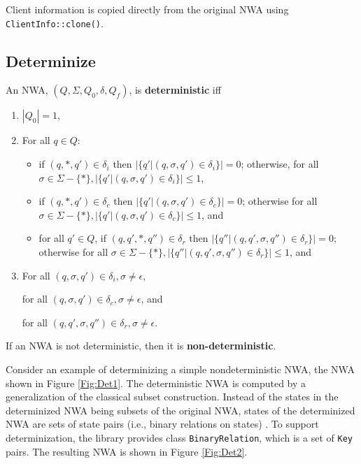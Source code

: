Client
information is copied directly from the original NWA using
\texttt{ClientInfo::clone()}.

\subsection{Determinize}
\label{Se:Determinize}

\begin{definition}
An NWA, $(Q,\Sigma,Q_0,\delta,Q_f)$, is \textbf{deterministic} iff 

\begin{enumerate} 

\item $|Q_0| = 1$, 

\item For all $q \in Q$: 
  \begin{itemize}
    \item if $(q,*,q') \in \delta_i$ then $|\{q'|(q,\sigma,q') \in
      \delta_i\}| = 0$; otherwise, for all $\sigma \in \Sigma - \{*\},
      |\{q'|(q,\sigma,q') \in \delta_i\}| \leq 1$,

    \item if $(q,*,q') \in \delta_c$ then $ |\{q'|(q,\sigma,q') \in
      \delta_c\}| = 0$; otherwise for all $\sigma \in \Sigma - \{*\},
      |\{q'|(q,\sigma,q') \in \delta_c\}| \leq 1$, and

    \item for all $q' \in Q$, if $(q,q',*,q'') \in \delta_r$ then
      $|\{q''|(q,q',\sigma,q'') \in \delta_r\}| = 0$; otherwise for all
      $\sigma \in \Sigma - \{*\}, |\{q''|(q,q',\sigma,q'') \in \delta_r\}|
      \leq 1$, and
  \end{itemize}
\item For all $(q,\sigma,q') \in \delta_i, \sigma \neq \epsilon$,

 for all $(q,\sigma,q') \in \delta_c, \sigma \neq \epsilon$,  and 

 for all $(q,q',\sigma,q'') \in \delta_r, \sigma \neq \epsilon$.\\

\end{enumerate}

If an NWA is not deterministic, then it is \textbf{non-deterministic}.
\end{definition}

Consider an example of determinizing a simple nondeterministic NWA, the NWA
shown in Figure \ref{Fig:Det1}.  The deterministic NWA is computed by a
generalization of the classical subset construction.  Instead of the states
in the determinized NWA being subsets of the original NWA, states of the
determinized NWA are sets of state pairs (i.e., binary relations on states)
\cite{JACM:AM2009}.  To support determinization, the library provides class
\texttt{BinaryRelation}, which is a set of \texttt{Key} pairs.  The resulting
NWA is shown in Figure \ref{Fig:Det2}.

